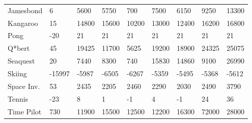 \documentclass[accepted]{article}
\theoremstyle{plain}
\theoremstyle{definition}
\theoremstyle{remark}
\begin{document}
\begin{table}[H]
{\begin{tabular}{@{}lllllllll@{}}
\multicolumn{1}{l|}{Jamesbond}  & \multicolumn{1}{l|}{6}      & 5600                      & 5750                     & \multicolumn{1}{l|}{700}    & \multicolumn{1}{l|}{7500}   & 6150                     & 9250                     & 13300                           \\
\multicolumn{1}{l|}{Kangaroo}   & \multicolumn{1}{l|}{15}     & 14800                     & 15600                    & \multicolumn{1}{l|}{10200}  & \multicolumn{1}{l|}{13000}  & 12400                    & 16200                    & 16800                           \\
\multicolumn{1}{l|}{Pong}       & \multicolumn{1}{l|}{-20}    & 21                        & 21                       & \multicolumn{1}{l|}{21}     & \multicolumn{1}{l|}{21}     & 21                       & 21                       & 21                              \\
\multicolumn{1}{l|}{Q*bert}     & \multicolumn{1}{l|}{45}     & 19425                     & 11700                    & \multicolumn{1}{l|}{5625}   & \multicolumn{1}{l|}{19200}  & 18900                    & 24325                    & 25075                           \\
\multicolumn{1}{l|}{Seaquest}   & \multicolumn{1}{l|}{20}     & 7440                      & 8300                     & \multicolumn{1}{l|}{740}    & \multicolumn{1}{l|}{15830}  & 14860                    & 9100                     & 26990                           \\
\multicolumn{1}{l|}{Skiing}     & \multicolumn{1}{l|}{-15997} & -5987                     & -6505                    & \multicolumn{1}{l|}{-6267}  & \multicolumn{1}{l|}{-5359}  & -5495                    & -5368                    & -5612                           \\
\multicolumn{1}{l|}{Space Inv.} & \multicolumn{1}{l|}{53}     & 2435                      & 2205                     & \multicolumn{1}{l|}{2460}   & \multicolumn{1}{l|}{2290}   & 2030                     & 2490                     & 3790                            \\
\multicolumn{1}{l|}{Tennis}     & \multicolumn{1}{l|}{-23}    & 8                         & 1                        & \multicolumn{1}{l|}{-1}     & \multicolumn{1}{l|}{4}      & -1                       & 24                       & 36                              \\
\multicolumn{1}{l|}{Time Pilot} & \multicolumn{1}{l|}{730}    & 11900                     & 15500                    & \multicolumn{1}{l|}{12500}  & \multicolumn{1}{l|}{12200}  & 16300                    & 72000                    & 28000                           \\

\end{tabular}}
\end{table}
\end{document}
